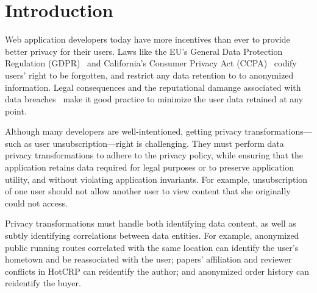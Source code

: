 \section{Introduction}
Web application developers today have more incentives than ever to provide better privacy for their
users.
%
Laws like the EU's General Data Protection Regulation (GDPR)~\cite{eu:gdpr} and California's
Consumer Privacy Act (CCPA)~\cite{ca:privacy-act} codify users' right to be forgotten, and restrict
any data retention to to anonymized information.
%
Legal consequences and the reputational damange associated with data breaches~\cite{breach:amazon,
breach:twitter, breach:fb, breach:marriott, breach:quora} make it good practice to minimize the user
data retained at any point.
%

%
Although many developers are well-intentioned, getting privacy transformations---such as user
unsubscription---right is challenging.
%
They must perform data privacy transformations to adhere to the privacy policy, while ensuring that
the application retains data required for legal purposes or to preserve application utility, and
without violating application invariants.
%
For example, unsubscription of one user should not allow another user to view content that she
originally could not access.


Privacy transformations must handle both identifying data content, as well as subtly identifying
correlations between data entities. For example, anonymized public running routes correlated with
the same location can identify the user's hometown and be reassociated with the user;
papers' affiliation and reviewer conflicts in HotCRP can reidentify the author; and anonymized order
history can reidentify the buyer.

